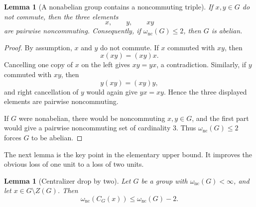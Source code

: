 \documentclass[11pt]{article}
\newtheorem{lemma}[theorem]{Lemma}
\theoremstyle{definition}
\newcommand{\nc}{\omega_{\mathrm{nc}}}
\begin{document}
\begin{lemma}[A nonabelian group contains a noncommuting triple]\label{lem:triple}
If $x,y\in G$ do not commute, then the three elements
\[
 x,\qquad y,\qquad xy
\]
are pairwise noncommuting.  Consequently, if $\nc(G)\le2$, then $G$ is abelian.
\end{lemma}

\begin{proof}
By assumption, $x$ and $y$ do not commute.  If $x$ commuted with $xy$, then
\[
 x(xy)=(xy)x.
\]
Cancelling one copy of $x$ on the left gives $xy=yx$, a contradiction.  Similarly, if $y$ commuted with $xy$, then
\[
 y(xy)=(xy)y,
\]
and right cancellation of $y$ would again give $yx=xy$.  Hence the three displayed elements are pairwise noncommuting.

If $G$ were nonabelian, there would be noncommuting $x,y\in G$, and the first part would give a pairwise noncommuting set of cardinality $3$.  Thus $\nc(G)\le2$ forces $G$ to be abelian.
\end{proof}

The next lemma is the key point in the elementary upper bound.  It improves the obvious loss of one unit to a loss of two units.

\begin{lemma}[Centralizer drop by two]\label{lem:centralizer-drop}
Let $G$ be a group with $\nc(G)<\infty$, and let $x\in G\setminus Z(G)$.  Then
\[
 \nc(C_G(x))\le \nc(G)-2.
\]
\end{lemma}
\end{document}
